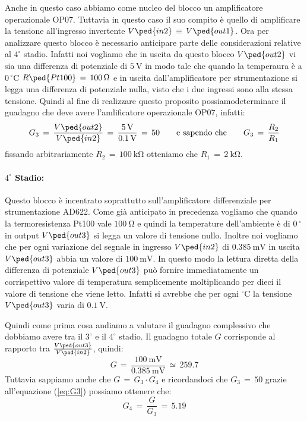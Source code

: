 Anche in questo caso abbiamo come nucleo del blocco un amplificatore operazionale OP07. Tuttavia in questo caso il suo compito è quello di amplificare la tensione all'ingresso invertente $V\ped{in2}\,\equiv\,V\ped{out1}$. Ora per analizzare questo blocco è necessario anticipare parte delle considerazioni relative al $4^\circ$ stadio. Infatti noi vogliamo che in uscita da questo blocco $V\ped{out2}$ vi sia una differenza di potenziale di $\SI{5}{\volt}$ in modo tale che quando la temperaura è a $0\,^\circ$C $R\ped{Pt100}\,=\,\SI{100}{\ohm}$ e in uscita dall'amplificatore per strumentazione si legga una differenza di potenziale nulla, visto che i due ingressi sono alla stessa tensione.
Quindi al fine di realizzare questo proposito possiamodeterminare il guadagno che deve avere l'amlificatore operazionale OP07, infatti:
\begin{equation}
	G_3\,=\,\frac{V\ped{out2}}{V\ped{in2}}\,=\,\frac{\SI{5}{\volt}}{\SI{0.1}{\volt}}\,=\, 50
	\qquad \text{e sapendo che} \qquad
	G_3\,=\,\frac{R_2}{R_1}
	\label{eq:G3}
\end{equation}
fissando arbitrariamente $R_2\,=\,\SI{100}{\kilo\ohm}$ otteniamo che $R_1\,=\,\SI{2}{\kilo\ohm}$.

\paragraph*{$4^\circ$ Stadio:}

Questo blocco è incentrato soprattutto sull'amplificatore differenziale per strumentazione AD622. Come già anticipato in precedenza vogliamo che quando la termoresistenza Pt100 vale $\SI{100}{\ohm}$ e quindi la temperature dell'ambiente è di $0\,^\circ$ in output $V\ped{out3}$ si legga un valore di tensione nullo.
Inoltre noi vogliamo che per ogni variazione del segnale in ingresso $V\ped{in2}$ di $\SI{0.385}{\milli\volt}$ in uscita $V\ped{out3}$ abbia un valore di $\SI{100}{\milli\volt}$. In questo modo la lettura diretta della differenza di potenziale $V\ped{out3}$ può fornire immediatamente un corrispettivo valore di temperatura semplicemente moltiplicando per dieci il valore di tensione che viene letto. Infatti si avrebbe che per ogni $^\circ$C la tensione $V\ped{out3}$ varia di $\SI{0.1}{\volt}$.

Quindi come prima cosa andiamo a valutare il guadagno complessivo che dobbiamo avere tra il $3^\circ$ e il $4^\circ$ stadio. Il guadagno totale $G$ corrisponde al rapporto tra $\frac{V\ped{out3}}{V\ped{in2}}$, quindi:
\begin{equation}
	G\,=\,\frac{\SI{100}{\milli\volt}}{\SI{0.385}{\milli\volt}}\,\simeq\,259.7
\end{equation}
Tuttavia sappiamo anche che $G\,=\,G_3 \cdot G_4$ e ricordandoci che $G_3\,=\,50$ grazie all'equazione (\ref{eq:G3}) possiamo ottenere che:
\begin{equation}
	G_4\,=\,\frac{G}{G_3}\,=\,5.19
\end{equation}

